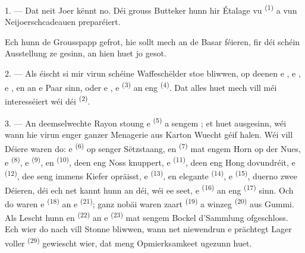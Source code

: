 \VUsaut{4.0mm}
\VUsaut{2.0mm}
\VUsaut{3.4mm}

1. --- Dat neit Joer kënnt no. Déi grouss Butteker hunn hir Étalage vu
 \textsuperscript{(1)} a vun Neijoerschcadeauen preparéiert.

Ech hunn de Grousspapp gefrot, hie sollt mech an de Basar féieren, fir déi schéin
Ausstellung ze gesinn, an hien huet jo gesot.

2. --- Als éischt si mir virun schéine Waffeschëlder stoe bliwwen, op deenen e
, e , e , en  an e Paar
 sinn, oder e , e 
\textsuperscript{(3)} an eng  \textsuperscript{(4)}. Dat alles huet
mech vill méi interesséiert wéi déi  \textsuperscript{(2)}.

\VUsaut{3.0mm}
\VUsaut{2.6mm}

3. --- An deemselwechte Rayon stoung e  \textsuperscript{(5)} a
sengem ; et huet ausgesinn, wéi wann hie virun enger ganzer
Menagerie aus Karton Wuecht géif halen. Wéi vill Déiere waren do: e 
\textsuperscript{(6)} op senger Sëtzstaang, en  \textsuperscript{(7)}
mat engem Horn op der Nues, e  \textsuperscript{(8)}, e
 \textsuperscript{(9)}, en  \textsuperscript{(10)}, deen eng
Noss knuppert, e  \textsuperscript{(11)}, deen eng Hong dovundréit, e
 \textsuperscript{(12)}, dee seng immens Kiefer opräisst, e
 \textsuperscript{(13)}, en elegante 
\textsuperscript{(14)}, e  \textsuperscript{(15)}, duerno zwee
Déieren, déi ech net kannt hunn an déi, wéi ee seet, e 
\textsuperscript{(16)} an eng  \textsuperscript{(17)} sinn. Och do waren e
 \textsuperscript{(18)} an e  \textsuperscript{(21)};
ganz nobäi waren zaart  \textsuperscript{(19)} a winzeg
 \textsuperscript{(20)} aus Gummi. Als Lescht hunn en
 \textsuperscript{(22)} an e  \textsuperscript{(23)}
mat sengem Bockel d'Sammlung ofgeschloss. Ech wier do nach vill Stonne bliwwen, wann
net niewendrun e prächtegt Lager voller  \textsuperscript{(29)}
gewiescht wier, dat meng Opmierksamkeet ugezunn huet.

